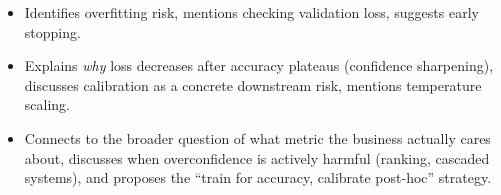 \begin{interviewq}

\goodgreat
\begin{itemize}
    \item {} Identifies overfitting risk, mentions checking validation loss, suggests early stopping.
    \item {} Explains \textit{why} loss decreases after accuracy plateaus (confidence sharpening), discusses calibration as a concrete downstream risk, mentions temperature scaling.
    \item {} Connects to the broader question of what metric the business actually cares about, discusses when overconfidence is actively harmful (ranking, cascaded systems), and proposes the ``train for accuracy, calibrate post-hoc'' strategy.
\end{itemize}

\end{interviewq}

